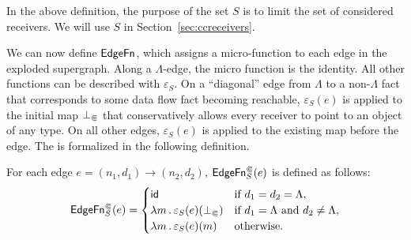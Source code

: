 In the above definition, the purpose of the set $S$ is to limit the set of considered receivers. We will use $S$ in Section~\ref{sec:ccreceivers}.


%

We can now define $\textsf{EdgeFn}$, which assigns a micro-function to each edge in
the exploded supergraph. 
Along a $\Lambda$-edge, the micro function is the identity. 
All other functions can be described with $\varepsilon_S$.
On a ``diagonal'' edge from $\Lambda$ to a non-$\Lambda$ fact that corresponds
to some data flow fact becoming reachable, $\varepsilon_S(e)$ is applied to the initial
map $\bot_\Subset$ that conservatively allows every receiver to point to an object of any type.
On all other edges, $\varepsilon_S(e)$ is applied to the existing map before the edge.
The is formalized in the following definition.
\begin{definition}\label{def:edgefn}
For each edge $e = (n_1,d_1) \to (n_2,d_2)$, $\textsf{EdgeFn}^\Subset_{S}(e)$ is defined as follows:
  \begin{equation}\label{eq:edgefndef}
      \textsf{EdgeFn}^\Subset_{S}(e)=
        \begin{cases}
          \textsf{id}  &\text{if $d_1=d_2=\Lambda$},\\
          \lambda m\,.\,\varepsilon_S(e)(\bot_\Subset) &\text{if $d_1=\Lambda$ and $d_2\ne\Lambda$},\\
          \lambda m\,.\,\varepsilon_S(e)(m)  &\text{otherwise.}
        \end{cases}
  \end{equation}
\end{definition}


